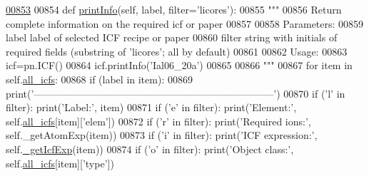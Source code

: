 \begin{DoxyCode}
\hypertarget{classpyneb_1_1core_1_1icf_1_1_i_c_f_l00853}{}\hyperlink{classpyneb_1_1core_1_1icf_1_1_i_c_f_a156850dec8c7457034434b3080c9a517}{00853} 
00854     \textcolor{keyword}{def }\hyperlink{classpyneb_1_1core_1_1icf_1_1_i_c_f_a156850dec8c7457034434b3080c9a517}{printInfo}(self, label, filter='licores'): 
00855         \textcolor{stringliteral}{""" }
00856 \textcolor{stringliteral}{        Return complete information on the required icf or paper}
00857 \textcolor{stringliteral}{        }
00858 \textcolor{stringliteral}{        Parameters:}
00859 \textcolor{stringliteral}{            label    label of selected ICF recipe or paper}
00860 \textcolor{stringliteral}{            filter   string with initials of required fields (substring of 'licores'; all by default)   }
00861 \textcolor{stringliteral}{            }
00862 \textcolor{stringliteral}{        Usage:}
00863 \textcolor{stringliteral}{        icf=pn.ICF()}
00864 \textcolor{stringliteral}{        icf.printInfo('Ial06\_20a')}
00865 \textcolor{stringliteral}{                 }
00866 \textcolor{stringliteral}{        """}        
00867         \textcolor{keywordflow}{for} item \textcolor{keywordflow}{in} self.\hyperlink{classpyneb_1_1core_1_1icf_1_1_i_c_f_a854ee87a53feb102e429e902227ce88b}{all\_icfs}:
00868             \textcolor{keywordflow}{if} (label \textcolor{keywordflow}{in} item):
00869                 print(\textcolor{stringliteral}{'------------------------------------------------------------------------'})
00870                 \textcolor{keywordflow}{if} (\textcolor{stringliteral}{'l'} \textcolor{keywordflow}{in} filter): print(\textcolor{stringliteral}{'Label:'}, item)
00871                 \textcolor{keywordflow}{if} (\textcolor{stringliteral}{'e'} \textcolor{keywordflow}{in} filter): print(\textcolor{stringliteral}{'Element:'}, self.\hyperlink{classpyneb_1_1core_1_1icf_1_1_i_c_f_a854ee87a53feb102e429e902227ce88b}{all\_icfs}[item][\textcolor{stringliteral}{'elem'}])
00872                 \textcolor{keywordflow}{if} (\textcolor{stringliteral}{'}\textcolor{stringliteral}{r' in filter): print('}Required ions:', self.\_getAtomExp(item))
00873                 \textcolor{keywordflow}{if} (\textcolor{stringliteral}{'i'} \textcolor{keywordflow}{in} filter): print(\textcolor{stringliteral}{'ICF expression:'}, self.\hyperlink{classpyneb_1_1core_1_1icf_1_1_i_c_f_a247f123a65d0150ba0de11e0a7756e4b}{\_getIcfExp}(item))
00874                 \textcolor{keywordflow}{if} (\textcolor{stringliteral}{'o'} \textcolor{keywordflow}{in} filter): print(\textcolor{stringliteral}{'Object class:'}, self.\hyperlink{classpyneb_1_1core_1_1icf_1_1_i_c_f_a854ee87a53feb102e429e902227ce88b}{all\_icfs}[item][\textcolor{stringliteral}{'type'}])

\end{DoxyCode}
